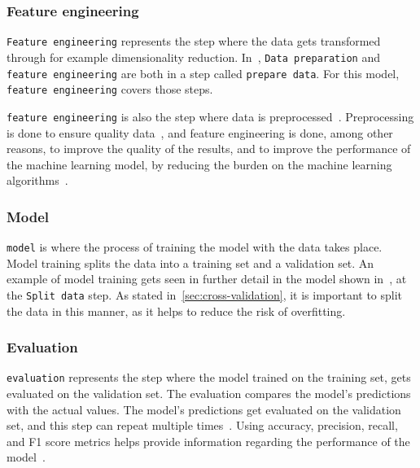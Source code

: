 \subsubsection{Feature engineering}\label{subsubsec:machine-learning-pipeline-feature-engineering}
\texttt{Feature engineering} represents the step where the data gets transformed through for example dimensionality reduction. In~\cite{machine-learning-pipeline-architecture}, \texttt{Data preparation} and \texttt{feature engineering} are both in a step called \texttt{prepare data}. For this model, \texttt{feature engineering} covers those steps.

\texttt{feature engineering} is also the step where data is preprocessed~\cite{machine-learning-pipeline-architecture}. Preprocessing is done to ensure quality data~\cite{data-preparation-for-data-mining}, and feature engineering is done, among other reasons, to improve the quality of the results, and to improve the performance of the machine learning model, by reducing the burden on the machine learning algorithms~\cite{dimensionality-reduction-reddy}.

\subsubsection{Model}\label{subsubsec:machine-learning-pipeline-model-training}
\texttt{model} is where the process of training the model with the data takes place. Model training splits the data into a training set and a validation set. An example of model training gets seen in further detail in the model shown in~\cite{machine-learning-pipeline-architecture}, at the \texttt{Split data} step. As stated in~\ref{sec:cross-validation}, it is important to split the data in this manner, as it helps to reduce the risk of overfitting.

\subsubsection{Evaluation}\label{subsubsec:machine-learning-pipeline-evaluation}
\texttt{evaluation} represents the step where the model trained on the training set, gets evaluated on the validation set. The evaluation compares the model's predictions with the actual values. The model's predictions get evaluated on the validation set, and this step can repeat multiple times~\cite{machine-learning-pipeline-architecture}. Using accuracy, precision, recall, and F1 score metrics helps provide information regarding the performance of the model~\cite{performance-evaluation}.

